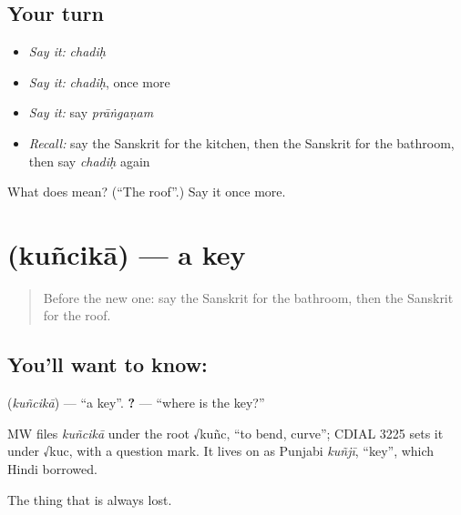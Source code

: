 \subsection*{Your turn}
\begin{itemize}
\raggedright
  \item \emph{Say it:} \emph{chadiḥ}
  \item \emph{Say it:} \emph{chadiḥ}, once more
  \item \emph{Say it:} say \emph{prāṅgaṇam}
  \item \emph{Recall:} say the Sanskrit for the kitchen, then the Sanskrit for the bathroom, then say \emph{chadiḥ} again
\end{itemize}

\begin{tcolorbox}[breakable,colback=teal!4,colframe=teal!35!black,title={Before you move on}]
What does  mean? (\textquotedblleft{}The roof\textquotedblright{}.) Say it once more.
\end{tcolorbox}
\section[\texorpdfstring{\sk{कुञ्चिका} (kuñcikā)}{कुञ्चिका (kuñcikā)}]{ (kuñcikā) — a key}

\label{lesson:SA-C77-key}



\begin{quote}
Before the new one: say the Sanskrit for the bathroom, then the Sanskrit for the roof.
\end{quote}

\subsection*{You'll want to know: }
\textbf{} (\emph{kuñcikā}) — \textquotedblleft{}a key\textquotedblright{}. \textbf{ ?} — \textquotedblleft{}where is the key?\textquotedblright{}

\begin{cousinweb}
MW files \emph{kuñcikā} under the root √kuñc, \textquotedblleft{}to bend, curve\textquotedblright{}; CDIAL 3225 sets it under √kuc, with a question mark. It lives on as Punjabi \emph{kuñjī}, \textquotedblleft{}key\textquotedblright{}, which Hindi borrowed.
\end{cousinweb}

\begin{grammarlens}[title={What you've built}]
The thing that is always lost.
\end{grammarlens}

